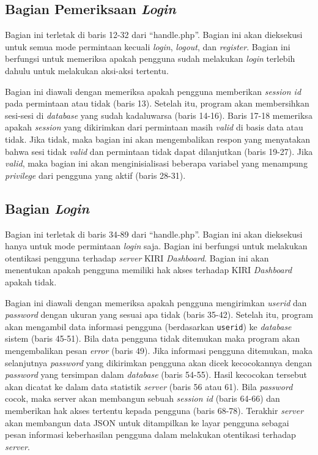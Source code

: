 \subsection{Bagian Pemeriksaan \textit{Login}}
\label{sec:pemeriksaanlogin}
Bagian ini terletak di baris 12-32 dari ``handle.php''. Bagian ini akan dieksekusi untuk semua mode permintaan kecuali \textit{login}, \textit{logout}, dan \textit{register}. Bagian ini berfungsi untuk memeriksa apakah pengguna sudah melakukan \textit{login} terlebih dahulu untuk melakukan aksi-aksi tertentu.

Bagian ini diawali dengan memeriksa apakah pengguna memberikan \textit{session id} pada permintaan atau tidak (baris 13). Setelah itu, program akan membersihkan sesi-sesi di \textit{database} yang sudah kadaluwarsa (baris 14-16). Baris 17-18 memeriksa apakah \textit{session} yang dikirimkan dari permintaan masih \textit{valid} di basis data atau tidak. Jika tidak, maka bagian ini akan mengembalikan respon yang menyatakan bahwa sesi tidak \textit{valid} dan permintaan tidak dapat dilanjutkan (baris 19-27). Jika \textit{valid}, maka bagian ini akan menginisialisasi beberapa variabel yang menampung \textit{privilege} dari pengguna yang aktif (baris 28-31).

\subsection{Bagian \textit{Login}}
\label{sec:bagianlogin}
Bagian ini terletak di baris 34-89 dari ``handle.php''. Bagian ini akan dieksekusi hanya untuk mode permintaan \textit{login} saja. Bagian ini berfungsi untuk melakukan otentikasi pengguna terhadap \textit{server} KIRI \textit{Dashboard}. Bagian ini akan menentukan apakah pengguna memiliki hak akses terhadap KIRI \textit{Dashboard} apakah tidak.

Bagian ini diawali dengan memeriksa apakah pengguna mengirimkan \textit{userid} dan \textit{password} dengan ukuran yang sesuai apa tidak (baris 35-42). Setelah itu, program akan mengambil data informasi pengguna (berdasarkan \texttt{userid}) ke \textit{database} sistem (baris 45-51). Bila data pengguna tidak ditemukan maka program akan mengembalikan pesan \textit{error} (baris 49). Jika informasi pengguna ditemukan, maka selanjutnya \textit{password} yang dikirimkan pengguna akan dicek kecocokannya dengan \textit{password} yang tersimpan dalam \textit{database} (baris 54-55). Hasil kecocokan tersebut akan dicatat ke dalam data statistik \textit{server} (baris 56 atau 61). Bila \textit{password} cocok, maka server akan membangun sebuah \textit{session id} (baris 64-66) dan memberikan hak akses tertentu kepada pengguna (baris 68-78). Terakhir \textit{server} akan membangun data JSON untuk ditampilkan ke layar pengguna sebagai pesan informasi keberhasilan pengguna dalam melakukan otentikasi terhadap \textit{server}.

